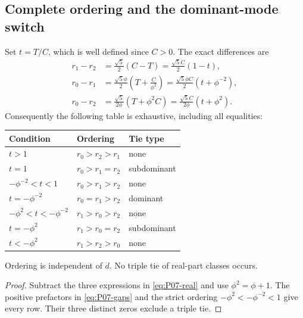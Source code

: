 \subsection{Complete ordering and the dominant-mode switch}
\label{slot:P07-2}
\begin{theorem}
\label{thm:P07-ordering}
Set $t=T/C$, which is well defined since $C>0$. The exact differences are
\begin{align}
 r_1-r_2&=\frac{\sqrt5}{2}(C-T)
              =\frac{\sqrt5 C}{2}(1-t),\label{eq:P07-gaps}\\
 r_0-r_1&=\frac{\sqrt5\phi}{2}
                    \left(T+\frac{C}{\phi^2}\right)
              =\frac{\sqrt5\phi C}{2}(t+\phi^{-2}),\nonumber\\
 r_0-r_2&=\frac{\sqrt5}{2\phi}(T+\phi^2 C)
              =\frac{\sqrt5 C}{2\phi}(t+\phi^2).\nonumber
\end{align}
Consequently the following table is exhaustive, including all equalities:
\begin{center}
\renewcommand{\arraystretch}{1.15}
\begin{tabular}{@{}l l l@{}}
\toprule
Condition&Ordering&Tie type\\
\midrule
$t>1$&$r_0>r_2>r_1$&none\\
$t=1$&$r_0>r_1=r_2$&subdominant\\
$-\phi^{-2}<t<1$&$r_0>r_1>r_2$&none\\
$t=-\phi^{-2}$&$r_0=r_1>r_2$&dominant\\
$-\phi^2<t<-\phi^{-2}$&$r_1>r_0>r_2$&none\\
$t=-\phi^2$&$r_1>r_0=r_2$&subdominant\\
$t<-\phi^2$&$r_1>r_2>r_0$&none\\
\bottomrule
\end{tabular}
\end{center}
Ordering is independent of $d$. No triple tie of real-part classes occurs.
\end{theorem}
\begin{proof}
Subtract the three expressions in \eqref{eq:P07-real} and use
$\phi^2=\phi+1$. The positive prefactors in \eqref{eq:P07-gaps}
and the strict ordering $-\phi^2<-\phi^{-2}<1$ give every row.
Their three distinct zeros exclude a triple tie.
\end{proof}

